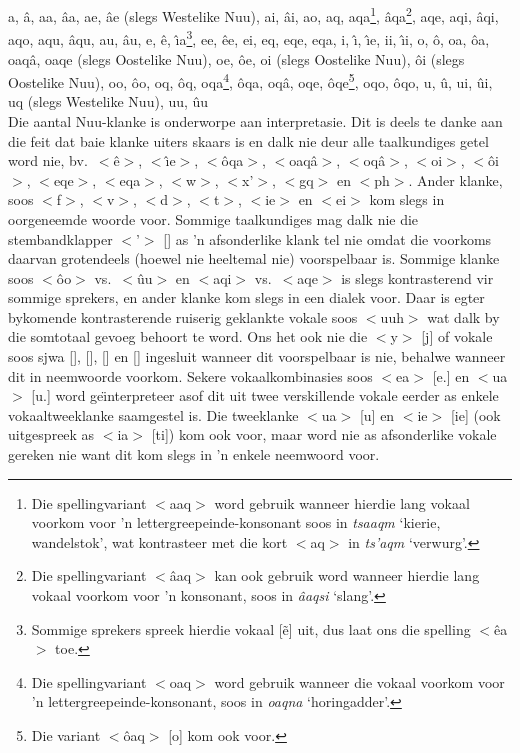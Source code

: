 a, \^{a}, aa, \^{a}a, ae, \^{a}e (slegs Westelike
N\textipa{\textvertline}uu), ai, \^{a}i, ao, aq, aqa\footnote{Die
spellingvariant $<$aaq$>$ word gebruik wanneer hierdie lang vokaal
voorkom voor 'n lettergreepeinde-konsonant soos in \emph{tsaaqm}
`kierie, wandelstok', wat kontrasteer met die kort $<$aq$>$ in
\emph{ts'aqm} `verwurg'.}, \^{a}qa\footnote{Die spellingvariant
$<$\^{a}aq$>$ kan ook gebruik word wanneer hierdie lang vokaal voorkom
voor 'n konsonant, soos in \emph{\textipa{\textvertline}\^{a}aqsi}
`slang'.}, aqe, aqi, \^{a}qi, aqo, aqu, \^{a}qu, au, \^{a}u, e, \^{e},
\^{\i}a\footnote{Sommige sprekers spreek hierdie vokaal
[\~{e}] uit, dus laat ons die spelling $<$\^{e}a$>$
toe.}, ee, \^{e}e, ei, eq, eqe, eqa, i, \^{\i}, \^{\i}e, ii, \^{\i}i,
o, \^{o}, oa, \^{o}a, oaq\^{a}, oaqe (slegs Oostelike
N\textipa{\textvertline}uu), oe, \^{o}e, oi (slegs Oostelike
N\textipa{\textvertline}uu), \^{o}i (slegs Oostelike
N\textipa{\textvertline}uu), oo, \^{o}o, oq, \^{o}q, oqa\footnote{Die
spellingvariant $<$oaq$>$ word gebruik wanneer die vokaal voorkom voor
'n lettergreepeinde-konsonant, soos in \emph{oaqna}
`horing\-adder'.}, \^{o}qa, oq\^{a}, oqe, \^{o}qe\footnote{Die variant
$<$\^{o}aq$>$
[o\textipa{\textbarrevglotstop{}}\textipa{\textbarrevglotstop{}}]
kom ook voor.}, oqo, \^{o}qo, u, \^{u}, ui, \^{u}i, uq (slegs
Westelike N\textipa{\textvertline}uu), uu, \^{u}u\\

Die aantal N\textipa{\textvertline}uu-klanke is onderworpe aan
interpretasie. Dit is deels te danke aan die feit dat baie klanke
uiters skaars is en dalk nie deur alle taalkundiges getel word nie,
bv.\ $<$\^{e}$>$, $<$\^{\i}e$>$, $<$\^{o}qa$>$, $<$oaq\^{a}$>$,
$<$oq\^{a}$>$, $<$oi$>$, $<$\^{o}i$>$, $<$eqe$>$, $<$eqa$>$, $<$w$>$,
$<$x'$>$, $<$g\textipa{\textvertline}q$>$ en $<$ph$>$.
Ander klanke, soos $<$f$>$, $<$v$>$, $<$d$>$, $<$t$>$, $<$ie$>$ en
$<$ei$>$ kom slegs in oorgeneemde woorde voor. Sommige taalkundiges
mag dalk nie die stembandklapper $<$'$>$ [] as 'n
afsonderlike klank tel nie omdat die voorkoms daarvan grotendeels
(hoewel nie heeltemal nie) voorspelbaar is. Sommige klanke soos
$<$\^{o}o$>$ vs.\ $<$\^{u}u$>$ en $<$aqi$>$ vs.\ $<$aqe$>$ is slegs
kontrasterend vir sommige sprekers, en ander klanke kom slegs in een
dialek voor. Daar is egter bykomende kontrasterende ruiserig geklankte
vokale soos $<$uuh$>$ wat dalk by die somtotaal gevoeg behoort te
word. Ons het ook nie die $<$y$>$ [j] of vokale soos sjwa
[], [], [] en [] ingesluit
wanneer dit voorspelbaar is nie, behalwe wanneer dit in neemwoorde
voorkom. Sekere vokaalkombinasies soos $<$ea$>$ [e.] en
$<$ua$>$ [u.] word ge\"{\i}nterpreteer asof dit uit twee
verskillende vokale eerder as enkele vokaaltweeklanke saamgestel is.
Die tweeklanke $<$ua$>$ [u] en $<$ie$>$ [ie] (ook
uitgespreek as $<$ia$>$ [ti]) kom ook voor, maar word nie
as afsonderlike vokale gereken nie want dit kom slegs in 'n enkele
neemwoord voor.\\

